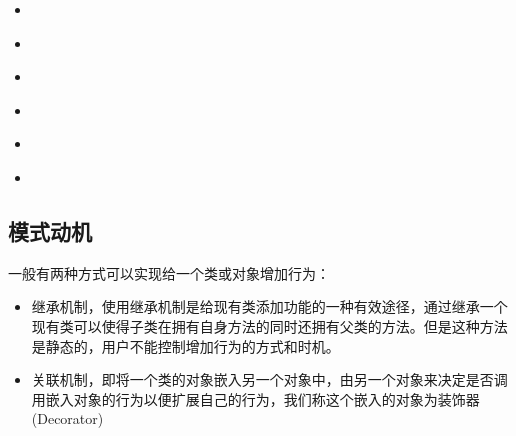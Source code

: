 \documentclass[letterpaper,10pt,english]{sphinxmanual}
\begin{document}
\begin{sphinxShadowBox}
\begin{itemize}
\begin{itemize}
\item {} 
\sphinxAtStartPar
{}\label{\detokenize{structural_patterns/decorator:id24}}{\hyperref[\detokenize{structural_patterns/decorator:id10}]{}}

\item {} 
\sphinxAtStartPar
{}\label{\detokenize{structural_patterns/decorator:id25}}{\hyperref[\detokenize{structural_patterns/decorator:id11}]{}}

\item {} 
\sphinxAtStartPar
{}\label{\detokenize{structural_patterns/decorator:id26}}{\hyperref[\detokenize{structural_patterns/decorator:id12}]{}}

\item {} 
\sphinxAtStartPar
{}\label{\detokenize{structural_patterns/decorator:id27}}{\hyperref[\detokenize{structural_patterns/decorator:id13}]{}}

\item {} 
\sphinxAtStartPar
{}\label{\detokenize{structural_patterns/decorator:id28}}{\hyperref[\detokenize{structural_patterns/decorator:id14}]{}}

\item {} 
\sphinxAtStartPar
{}\label{\detokenize{structural_patterns/decorator:id29}}{\hyperref[\detokenize{structural_patterns/decorator:id15}]{}}

\end{itemize}

\end{itemize}
\end{sphinxShadowBox}


\subsection{模式动机}
\label{\detokenize{structural_patterns/decorator:id3}}
\sphinxAtStartPar
一般有两种方式可以实现给一个类或对象增加行为：
\begin{itemize}
\item {} 
\sphinxAtStartPar
继承机制，使用继承机制是给现有类添加功能的一种有效途径，通过继承一个现有类可以使得子类在拥有自身方法的同时还拥有父类的方法。但是这种方法是静态的，用户不能控制增加行为的方式和时机。

\item {} 
\sphinxAtStartPar
关联机制，即将一个类的对象嵌入另一个对象中，由另一个对象来决定是否调用嵌入对象的行为以便扩展自己的行为，我们称这个嵌入的对象为装饰器(Decorator)

\end{itemize}
\end{document}
